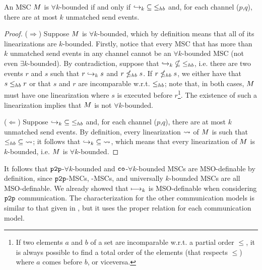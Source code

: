 \begin{proposition}
	An MSC $M$ is $\forall k$-bounded if and only if $\hookrightarrow_{k} \;\subseteq\; \leq_{hb}$ and, for each channel ($p$,$q$), there are at most $k$ unmatched send events.
\end{proposition}
\begin{proof}
	($\Rightarrow$) Suppose $M$ is $\forall k$-bounded, which by definition means that all of its linearizations are $k$-bounded. Firstly, notice that every MSC that has more than $k$ unmatched send events in any channel cannot be an $\forall k$-bounded MSC (not even $\exists k$-bounded). By contradiction, suppose that $\hookrightarrow_{k} \;\nsubseteq\; \leq_{hb}$, i.e. there are two events $r$ and $s$ such that $r \hookrightarrow_{k} s$ and $r \nleq_{hb} s$. If $r \nleq_{hb} s$, we either have that $s \leq_{hb} r$ or that $s$ and $r$ are incomparable w.r.t. $\leq_{hb}$; note that, in both cases, $M$ must have one linearization where $s$ is executed before $r$\footnote{If two elements $a$ and $b$ of a set are incomparable w.r.t. a partial order $\le$, it is always possible to find a total order of the elements (that respects $\le$) where $a$ comes before $b$, or viceversa.}. The existence of such a linearization implies that $M$ is not $\forall k$-bounded.
	
	($\Leftarrow$) Suppose $\hookrightarrow_{k} \;\subseteq\; \leq_{hb}$ and, for each channel ($p$,$q$), there are at most $k$ unmatched send events. By definition, every linearization $\rightsquigarrow$ of $M$ is such that $\leq_{hb} \;\subseteq\; \rightsquigarrow$; it follows that $\hookrightarrow_{k} \;\subseteq\; \rightsquigarrow$, which means that every linearization of $M$ is $k$-bounded, i.e. $M$ is $\forall k$-bounded.
\end{proof}

It follows that $\mathtt{p2p}$-$\forall k$-bounded and $\mathtt{co}$-$\forall k$-bounded MSCs are MSO-definable by definition, since $\mathtt{p2p}$-MSCs, \co-MSCs, and universally $k$-bounded MSCs are all MSO-definable. We already showed that $\longmapsto_k$ is MSO-definable when considering $\mathtt{p2p}$ communication. The characterization for the other communication models is similar to that given in \cite{DBLP:conf/fossacs/LohreyM02}, but it uses the proper relation for each communication model.


